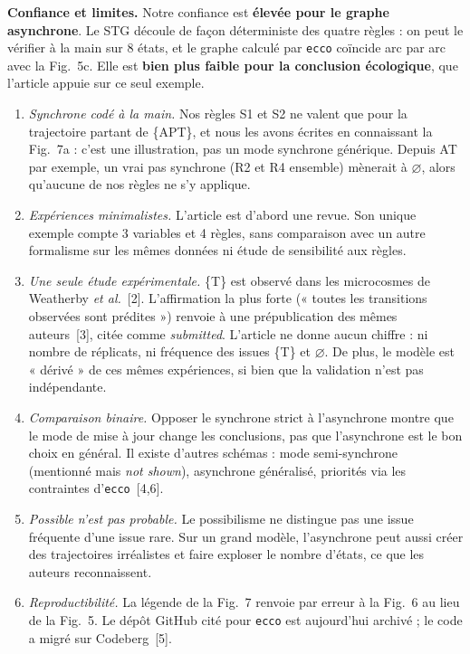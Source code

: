\documentclass[10pt,a4paper]{article}
\newcommand{\ecco}{\texttt{ecco}}
\newcommand{\vide}{$\varnothing$}
\begin{document}
\textbf{Confiance et limites.} Notre confiance est \textbf{élevée pour le graphe asynchrone}. Le STG découle de façon déterministe des quatre règles : on peut le vérifier à la main sur 8 états, et le graphe calculé par \ecco{} coïncide arc par arc avec la Fig.~5c. Elle est \textbf{bien plus faible pour la conclusion écologique}, que l'article appuie sur ce seul exemple.
\begin{enumerate}
\item \emph{Synchrone codé à la main.} Nos règles S1 et S2 ne valent que pour la trajectoire partant de \{APT\}, et nous les avons écrites en connaissant la Fig.~7a : c'est une illustration, pas un mode synchrone générique. Depuis AT par exemple, un vrai pas synchrone (R2 et R4 ensemble) mènerait à \vide, alors qu'aucune de nos règles ne s'y applique.
\item \emph{Expériences minimalistes.} L'article est d'abord une revue. Son unique exemple compte 3 variables et 4 règles, sans comparaison avec un autre formalisme sur les mêmes données ni étude de sensibilité aux règles.
\item \emph{Une seule étude expérimentale.} \{T\} est observé dans les microcosmes de Weatherby \emph{et al.}~[2]. L'affirmation la plus forte (« toutes les transitions observées sont prédites ») renvoie à une prépublication des mêmes auteurs~[3], citée comme \emph{submitted}. L'article ne donne aucun chiffre : ni nombre de réplicats, ni fréquence des issues \{T\} et \vide. De plus, le modèle est « dérivé » de ces mêmes expériences, si bien que la validation n'est pas indépendante.
\item \emph{Comparaison binaire.} Opposer le synchrone strict à l'asynchrone montre que le mode de mise à jour change les conclusions, pas que l'asynchrone est le bon choix en général. Il existe d'autres schémas : mode semi-synchrone (mentionné mais \emph{not shown}), asynchrone généralisé, priorités via les contraintes d'\ecco~[4,6].
\item \emph{Possible n'est pas probable.} Le possibilisme ne distingue pas une issue fréquente d'une issue rare. Sur un grand modèle, l'asynchrone peut aussi créer des trajectoires irréalistes et faire exploser le nombre d'états, ce que les auteurs reconnaissent.
\item \emph{Reproductibilité.} La légende de la Fig.~7 renvoie par erreur à la Fig.~6 au lieu de la Fig.~5. Le dépôt GitHub cité pour \ecco{} est aujourd'hui archivé ; le code a migré sur Codeberg~[5].
\end{enumerate}
\end{document}
